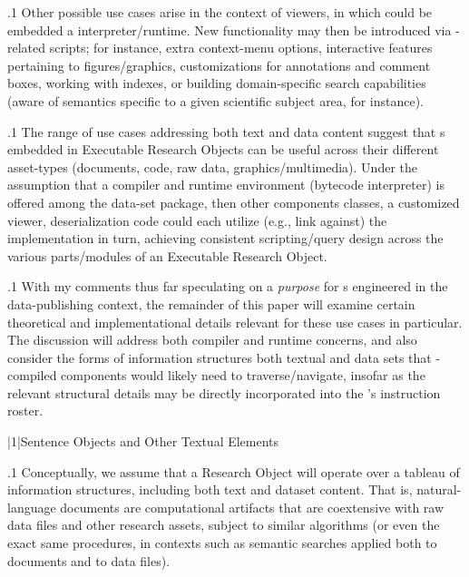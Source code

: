 \documentclass[11pt, twocolumn]{article}
\begin{document}
\p.1{%
Other possible use cases arise in the context of  viewers,
in which could be embedded a  interpreter/runtime.
New functionality may then be introduced via -related
scripts; for instance, extra context-menu options,
interactive features pertaining to figures/graphics,
customizations for  annotations and comment
boxes, working with indexes, or building domain-specific
search capabilities (aware of semantics specific to a
given scientific subject area, for instance).
}%

\p.1{%
The range of use cases addressing both text and data content
suggest that s embedded in Executable Research Objects
can be useful across their different asset-types (documents,
code, raw data, graphics/multimedia). Under the assumption
that a compiler and runtime environment (bytecode interpreter)
is offered among the data-set package, then other
components \mdash{}  classes, a customized  viewer, deserialization
code \mdash{} could each utilize (e.g., link against) the
 implementation in turn, achieving consistent scripting/query
design across the various parts/modules of an Executable Research Object.
}%

\p.1{%
With my comments thus far speculating on a \textit{purpose} for s engineered
in the data-publishing context, the remainder of this
paper will examine certain theoretical and implementational
details relevant for these use cases in particular.
The discussion will address both compiler and runtime
concerns, and also consider the forms of information
structures \mdash{} both textual and data sets \mdash{} that
-compiled components would likely
need to traverse/navigate, insofar as the relevant
structural details may be directly incorporated
into the 's instruction roster.
}%


\s|1|{Sentence Objects and Other Textual Elements}

\p.1{%
Conceptually, we assume that a Research Object
 will operate over a tableau of information
structures, including both text and dataset content.
That is, natural-language documents are computational
artifacts that are coextensive with raw data
files and other research assets, subject to
similar algorithms (or even the exact same
procedures, in contexts such as semantic searches
applied both to documents and to data files).
}%
\end{document}
